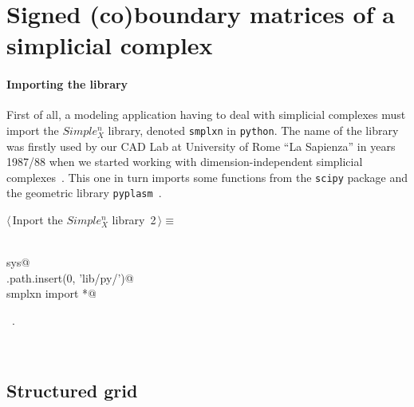 \documentclass[11pt,oneside]{article}	%
\begin{document}
\section{Signed (co)boundary matrices of a simplicial complex}
\label{simplicial}

\paragraph{Importing the library}
First of all, a modeling application having to deal with simplicial complexes must import the $Simple_X^n$ library, denoted \texttt{smplxn} in \texttt{python}. The name of the library was firstly used by our CAD Lab at University of Rome ``La Sapienza'' in years 1987/88 when we started working with dimension-independent simplicial complexes~\cite{Paoluzzi:1993:DMS:169728.169719}. This one in turn imports some functions from the \texttt{scipy} package and the geometric library \texttt{pyplasm}~\cite{}.

\begin{flushleft} \small
\begin{minipage}{\linewidth} \label{scrap1}
\protect{}$\langle\,$Inport the $Simple_X^n$ library\nobreak\ {\footnotesize 2}$\,\rangle\equiv$
\vspace{-1ex}
\begin{list}{}{} \item
\mbox{}\verb@@\\
\mbox{}\verb@import sys@\\
\mbox{}\verb@sys.path.insert(0, 'lib/py/')@\\
\mbox{}\verb@from smplxn import *@\\
\mbox{}\verb@@{\NWsep}
\end{list}
\vspace{-1ex}
\footnotesize\addtolength{\baselineskip}{-1ex}
\begin{list}{}{\setlength{\itemsep}{-\parsep}\setlength{\itemindent}{-\leftmargin}}
\item \NWtxtMacroRefIn\ .
\end{list}
\end{minipage}\\[4ex]
\end{flushleft}
\subsection{Structured grid}
\end{document}
